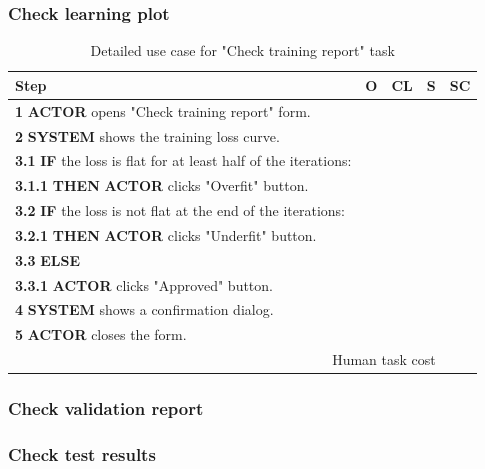 \subsubsection{Check learning plot}

\begin{table}[H]
\centering
\begin{tabular}{|l|c|c|c|c|}
\hline
\textbf{Step} & \textbf{O} & \textbf{CL} & \textbf{S} & \textbf{SC} \\
\hline
\textbf{1} \textbf{ACTOR} opens "Check training report" form. & & & & \\
\hline
\textbf{2} \textbf{SYSTEM} shows the training loss curve. & & & & \\
\hline
\textbf{3.1} \textbf{IF} the loss is flat for at least half of the iterations: & & & & \\
\hline
\textbf{3.1.1} \textbf{THEN} \textbf{ACTOR} clicks "Overfit" button. & & & & \\
\hline
\textbf{3.2} \textbf{IF} the loss is not flat at the end of the iterations: & & & & \\
\hline
\textbf{3.2.1} \textbf{THEN} \textbf{ACTOR} clicks "Underfit" button. & & & & \\
\hline
\textbf{3.3} \textbf{ELSE} & & & & \\
\hline
\textbf{3.3.1} \textbf{ACTOR} clicks "Approved" button. & & & & \\
\hline
\textbf{4} \textbf{SYSTEM} shows a confirmation dialog. & & & & \\
\hline
\textbf{5} \textbf{ACTOR} closes the form. & & & & \\
\hline
\multicolumn{4}{|r|}{Human task cost} & \\
\hline
\end{tabular}
\caption{Detailed use case for "Check training report" task}
\label{table:check_training_report}
\end{table}

\subsubsection{Check validation report}

\subsubsection{Check test results}

